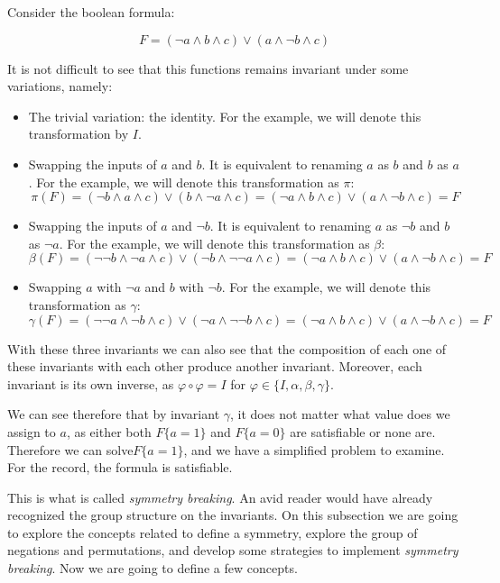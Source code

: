\begin{example}
Consider the boolean formula:

$$ F = (\neg a \land b  \land c) \lor (a \land \neg b \land c)$$

It is not difficult to see that this functions remains invariant under some variations, namely:

\begin{itemize}
\item The trivial variation: the identity. For the example, we will denote this transformation by  $I$.

\item Swapping the inputs of $a$ and $b$. It is equivalent to renaming $a$ as $b$ and $b$ as $a$. For the example, we will denote this transformation as $\pi$: 
  $$\pi(F) = (\neg b \land a  \land c) \lor (b \land \neg a \land c) = (\neg a \land b  \land c) \lor (a \land \neg b \land c) = F$$
\item Swapping the inputs of $a$ and $\neg b$. It is equivalent to renaming $a$ as $\neg b$ and $b$ as $\neg a$. For the example, we will denote this transformation as $\beta$: 
  $$\beta(F) = (\neg \neg b \land \neg a  \land c) \lor (\neg b \land \neg \neg a \land c) = (\neg a \land b  \land c) \lor (a \land \neg b \land c) = F$$

\item Swapping $a$ with $\neg a$ and $b$ with $\neg b$. For the example, we will denote this transformation as $\gamma$: 
  $$\gamma(F) = (\neg \neg a \land \neg b  \land c) \lor (\neg a \land \neg \neg b \land c) = (\neg a \land b  \land c) \lor (a \land \neg b \land c) = F$$
\end{itemize}

With these three invariants we can also see that the composition of each one of these invariants with each other produce another invariant. Moreover, each invariant is its own inverse, as $\varphi \circ \varphi = I $ for $\varphi \in \{I, \alpha, \beta, \gamma\}$.

We can see therefore that by invariant $\gamma$, it does not matter what value does we assign to $a$, as either both $F\{a = 1\}$ and $F\{a=0\}$ are satisfiable or none are. Therefore we can solve$F\{a=1\}$, and we have a simplified problem to examine. For the record, the formula is satisfiable.

\end{example}



This is what is called \emph{symmetry breaking}. An avid reader would have already recognized the group structure on the invariants.  On this subsection we are going to explore the concepts related to define a symmetry, explore the group of negations and permutations, and develop some strategies to implement \emph{symmetry breaking}.  Now we are going to define a few concepts.


